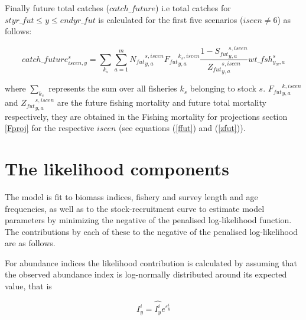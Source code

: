 \documentclass{article}
\begin{document}
Finally 
future total catches ($catch\_future$) i.e total catches for $styr\_fut \leq y \leq endyr\_fut$ is calculated for the first five scenarios ($iscen\neq 6$) as follows:


\begin{equation}
    catch\_future^s_{iscen,y}=\sum_{k_s} \sum_{a=1}^m{N_{fut}}^{s,iscen}_{y,a}{F_{fut}}^{k_s, iscen}_{y,a}\dfrac{1-{S_{fut}}^{s,iscen}_{y,a}}{{Z_{fut}}^{s,iscen}_{y,a}} wt\_fsh^s_{y_N,a}
\end{equation}

where $\displaystyle\sum_{k_s}$ represents the sum over all fisheries $k_s$ belonging to stock $s$. ${F_{fut}}^{k, iscen}_{y,a}$ and  ${Z_{fut}}^{s,iscen}_{y,a}$ are the future fishing mortality and future total mortality respectively, they are obtained in the Fishing mortality for projections section \ref{Fproj} for the respective $iscen$ (see equations (\ref{ffut}) and (\ref{zfut})).


\section{The likelihood components}

The model is fit to biomass indices, fishery and survey length and age frequencies, as well as to the stock-recruitment curve to estimate model parameters by minimizing the negative of the penalised log-likelihood function.
The contributions by each of these to the negative of
the penalised log-likelihood are as follows. 

For abundance indices the likelihood contribution
is calculated by assuming that the observed abundance index is log-normally distributed around its expected value, that is

\begin{equation}
    I^i_y = \hat{I^i_y}e^{\varepsilon^i_y}
\end{equation}
\end{document}
